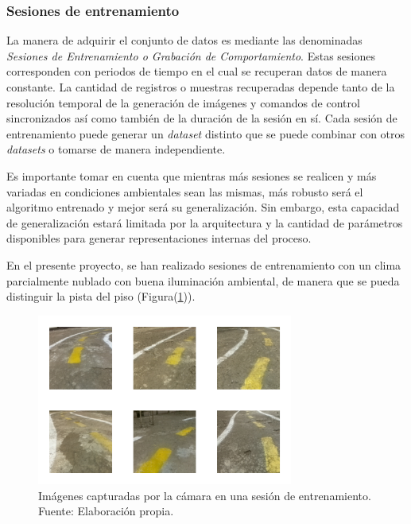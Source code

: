         \subsubsection{Sesiones de entrenamiento}
        La manera de adquirir el conjunto de datos es mediante las denominadas \textit{Sesiones de Entrenamiento o Grabación de Comportamiento}.
        Estas sesiones corresponden con periodos de tiempo en el cual se recuperan datos de manera constante. La cantidad de registros 
        o muestras recuperadas depende tanto de la resolución temporal de la generación de imágenes y comandos de control sincronizados 
        así como también de la duración de la sesión en sí. Cada sesión de entrenamiento puede generar un \textit{dataset} distinto 
        que se puede combinar con otros \textit{datasets} o tomarse de manera independiente. 

        Es importante tomar en cuenta que mientras más sesiones se realicen y más variadas en condiciones ambientales sean las mismas, 
        más robusto será el algoritmo entrenado y mejor será su generalización. Sin embargo, esta capacidad de generalización estará 
        limitada por la arquitectura y la cantidad de parámetros disponibles para generar representaciones internas del proceso. 

        En el presente proyecto, se han realizado sesiones de entrenamiento con un clima parcialmente nublado con buena iluminación 
        ambiental, de manera que se pueda distinguir la pista del piso (Figura(\ref{fig:fotosejemplo})).

        \begin{figure}[!h] 
            \centering
            \includegraphics[width=0.75\textwidth]{img/fotosejemplo}
            \caption[Imágenes capturadas por la cámara en una sesión de entrenamiento]{Imágenes capturadas por la cámara en una sesión de entrenamiento. Fuente: Elaboración propia. }

            \label{fig:fotosejemplo}
        \end{figure}

